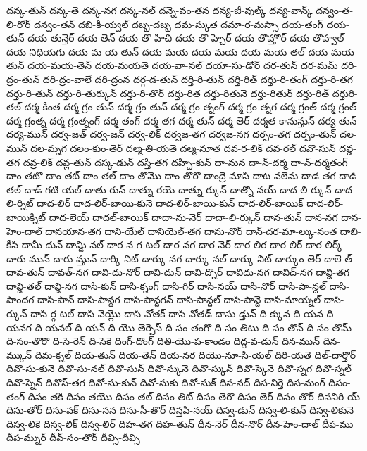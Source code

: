 {దన్క-తున్
దన్క-తె
దన్క-నగ
దన్క-నల్
దన్నె-వం-తన
దన్య-జీ-వుల్క్
దన్య-వాన్క్
దన్వం-త-లి-రోర్
దన్వం-తన్
దబి-కి-య్వల్
దబ్బ-దబ్బ
దమ-స్కుత
దమా-ర-మస్సా
దయ-తంగ్
దయ-తున్
దయ-తున్తెర్
దయ-తెన్
దయ-తొ-హిచి
దయ-తొ-హ్చెర్
దయ-తొహ్తొర్
దయ-తొహ్వల్
దయ-నిధియగు
దయ-మ-య-తున్
దయ-మయ
దయ-మయ
దయ-మయ-తల్
దయ-మయ-తున్
దయ-మయ-తెన్
దయ-మయతె
దయ-వా-నల్
దయా-సు-డోర్
దర-తున్
దర-మమ్
దరి-ద్రం-తున్
దరి-ద్రం-వాలే
దరి-ద్రంన
దర్గ-డ-తున్
దర్తి-రి-తున్
దర్తి-రిత్
దర్తు-రి-తంగ్
దర్తు-రి-తగ
దర్తు-రి-తున్
దర్తు-రి-తుర్కున్
దర్తు-రి-తొర్
దర్తు-రిత
దర్తు-రితునె
దర్తు-రితుర్
దర్తు-రిత్
దర్తురి-తల్
దర్మ-కీంత
దర్మ-గ్రం-తున్
దర్మ-గ్రం-తున్
దర్మ-గ్రం-త్నంగ్
దర్మ-గ్రం-త్నగ
దర్మ-గ్రంత్
దర్మ-గ్రంత్
దర్మ-గ్రంత్న
దర్మ-గ్రంత్నంగ్
దర్మ-తంగ్
దర్మ-తగ
దర్మ-తున్
దర్మ-తెర్
దర్మత-కానున్తున్
దర్య-తున్
దర్య-మున్
దర్వ-జత్
దర్వ-జన్
దర్వ-లిక్
దర్వజ-తగ
దర్వజ-నగ
దర్సం-తగ
దర్సం-తున్
దల-మున్
దల-మ్నగ
దలం-కుం-తెర్
దల్మ-తి-యతె
దల్మ-నూత
దవ-ర-లిక్
దవ-రల్
దవొ-సున్
దవ్డ-తగ
దవ్ర-లిక్
దవ్ల-తున్
దస్క-డున్
దస్తి-తగ
దహ్చి-కున్
దా-నున
దా-న్-దర్మ
దా-న్-దర్మతంగ్
దాం-తటొ
దాం-తట్
దాం-తల్
దాం-తొమొ
దాం-తొరొ
దాంద్రె-మాసి
దాట-వలెను
దాడ-తగ
దాడి-తల్
దాడ్-గటి-యల్
దాతు-రున్
దాత్ను-రయె
దాత్ను-ర్కున్
దాత్నొ-నయ్
దాద-లి-ర్కున్
దాద-లి-ర్నిట్
దాద-లిర్
దాద-లిర్-బాయి-కునె
దాద-లిర్-బాయి-కున్
దాద-లిర్-బాయిక్
దాద-లిర్-బాయిక్నిట్
దాద-లెయ్
దాదల్-బాయిక్
దాదా-ను-నెర్
దాదా-లి-ర్కున్
దాన-తున్
దాన-నగ
దాన-హెం-దాల్
దానయాన-తగ
దాని-యేల్
దానియెల్-తగ
దాను-నొర్
దాన్-దర-మా-ల్కు-నంత
దాబి-కీసి
దామీ-దున్
దామ్డి-నల్
దార-న-గ-టల్
దార-నగ
దార-నెర్
దార-లిర
దార-లిర్
దార-లిర్క్
దారు-మున్
దారు-మ్తున్
దార్కి-నిట్
దార్కు-నగ
దార్కు-నల్
దార్కు-నిట్
దార్కుం-తెర్
దాలె-త్
దావ-తున్
దావత్-నగ
దావి-దు-నొర్
దావి-దున్
దావి-ద్నొర్
దావిదు-నగ
దావిద్-నగ
దావ్డి-తగ
దావ్డి-తల్
దావ్డి-నగ
దాసి-కున్
దాసి-క్నంగ్
దాసి-గిర్
దాసి-నయ్
దాసి-నొర్
దాసి-పా-న్దల్
దాసి-పాందగ
దాసి-పాన్
దాసి-పాన్దగ
దాసి-పాన్దగన్
దాసి-పాన్దల్
దాసి-పాన్దె
దాసి-మాయ్నల్
దాసి-ర్కున్
దాసి-ర్గ-టల్
దాసి-వెయ్లొ
దాసి-వోతక్
దాసి-వోతడ్
దాసు-డ్తున్
ది-క్కున
ది-యన
ది-యనగ
ది-యనల్
ది-యన్
ది-యొ-తెర్పెస్
ది-సం-తంగొ
ది-సం-తిటు
ది-సం-తొన్
ది-సం-తొమ్
ది-సం-తొరొ
ది-సె-రెన్
ది-సెకె
దింగ్-దొంగ్
దితి-యొ-ప-కాండం
దిద్ద-వ-డున్
దిన-మున్
దిన-మ్కున్
దిమ-క్నల్
దియ-తున్
దియ-తెన్
దియ-నర
దియొ-నూ-సి-యల్
దిరి-యతె
దిల్-దార్తొర్
దివొ-సు-కునె
దివొ-సు-నల్
దివొ-సున్
దివొ-స్కునె
దివొ-స్కున్
దివొ-స్కెనె
దివొ-స్నగ
దివొ-స్నల్
దివొ-స్నెన్
దివొస్-తగ
దివో-సు-కున్
దివో-సుకు
దివో-సుక్
దిస-నద్
దిస-నిర్తె
దిస-నుంగ్
దిసం-తంగ్
దిసం-తకి
దిసం-తయొ
దిసం-తల్
దిసం-తిట్
దిసం-తెరొ
దిసం-తెర్
దిసం-తొర్
దిసనిరి-య్
దిసు-తోర్
దిసు-వక్
దిసు-సన
దిసు-సీ-తొర్
దిస్తపి-నయ్
దిస్వ-డున్
దిస్వ-లి-కున్
దిస్వ-లికునె
దిస్వ-లికె
దిస్వ-లిక్
దిస్వ-లిర్
దిహ-తగ
దిహ-తున్
దీన-నెర్
దీన-నొర్
దీన-హెం-దాల్
దీప-ము
దీప-మ్నుర్
దీవ్-సం-తొర్
దీవ్సి-దీవ్సి
}
